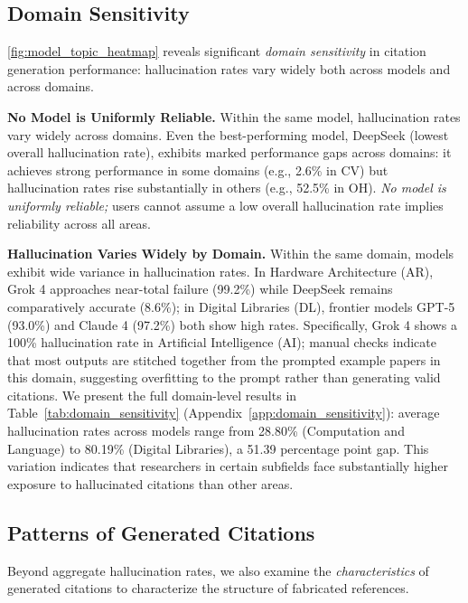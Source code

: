 \subsection{Domain Sensitivity}
\cref{fig:model_topic_heatmap} reveals significant \textit{domain sensitivity} in citation generation performance: hallucination rates vary widely both across models and across domains.

\noindent
\textbf{No Model is Uniformly Reliable.}
Within the same model, hallucination rates vary widely across domains. Even the best-performing model, DeepSeek (lowest overall hallucination rate), exhibits marked performance gaps across domains: it achieves strong performance in some domains (e.g., 2.6\% in CV) but hallucination rates rise substantially in others (e.g., 52.5\% in OH).
\textit{No model is uniformly reliable;} users cannot assume a low overall hallucination rate implies reliability across all areas.

\noindent
\textbf{Hallucination Varies Widely by Domain.}
Within the same domain, models exhibit wide variance in hallucination rates.
In Hardware Architecture (AR), Grok 4 approaches near-total failure (99.2\%) while DeepSeek remains comparatively accurate (8.6\%); in Digital Libraries (DL), frontier models GPT-5 (93.0\%) and Claude 4 (97.2\%) both show high rates.
Specifically, Grok 4 shows a 100\% hallucination rate in Artificial Intelligence (AI); manual checks indicate that most outputs are stitched together from the prompted example papers in this domain, suggesting overfitting to the prompt rather than generating valid citations.
We present the full domain-level results in Table~\ref{tab:domain_sensitivity} (Appendix~\ref{app:domain_sensitivity}): average hallucination rates across models range from 28.80\% (Computation and Language) to 80.19\% (Digital Libraries), a 51.39 percentage point gap.
This variation indicates that researchers in certain subfields face substantially higher exposure to hallucinated citations than other areas.



\subsection{Patterns of Generated Citations}

Beyond aggregate hallucination rates, we also examine the \textit{characteristics} of generated citations to characterize the structure of fabricated references.

